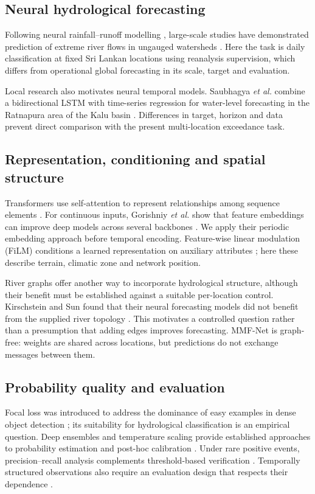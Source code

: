 \documentclass[conference]{IEEEtran}
\newcommand{\model}{MMF-Net}
\begin{document}
\subsection{Neural hydrological forecasting}
Following neural rainfall--runoff modelling \cite{kratzert2018}, large-scale
studies have demonstrated prediction of extreme river flows in ungauged
watersheds \cite{nearing2024}. Here the task is daily classification at fixed
Sri Lankan locations using reanalysis supervision, which differs from
operational global forecasting in its scale, target and evaluation.

Local research also motivates neural temporal models. Saubhagya \emph{et al.}
combine a bidirectional LSTM with time-series regression for water-level
forecasting in the Ratnapura area of the Kalu basin \cite{saubhagya2025}.
Differences in target, horizon and data prevent direct comparison with the
present multi-location exceedance task.

\subsection{Representation, conditioning and spatial structure}
Transformers use self-attention to represent relationships among sequence
elements \cite{vaswani2017}. For continuous inputs, Gorishniy \emph{et al.}
show that feature embeddings can improve deep models across several backbones
\cite{gorishniy2022}. We apply their periodic embedding approach before
temporal encoding. Feature-wise linear modulation (FiLM) conditions a learned
representation on auxiliary attributes \cite{perez2018}; here these describe
terrain, climatic zone and network position.

River graphs offer another way to incorporate hydrological structure, although
their benefit must be established against a suitable per-location control.
Kirschstein and Sun found that their neural forecasting models did not benefit
from the supplied river topology \cite{kirschstein2024}. This motivates a
controlled question rather than a presumption that adding edges improves
forecasting. \model{} is graph-free: weights are shared across locations, but
predictions do not exchange messages between them.

\subsection{Probability quality and evaluation}
Focal loss was introduced to address the dominance of easy examples in dense
object detection \cite{lin2017}; its suitability for hydrological
classification is an empirical question. Deep ensembles and temperature scaling
provide established approaches to probability estimation and post-hoc
calibration \cite{lakshminarayanan2017,guo2017}. Under rare positive events,
precision--recall analysis complements threshold-based verification
\cite{saito2015}. Temporally structured observations also require an evaluation
design that respects their dependence \cite{roberts2017}.
\end{document}
